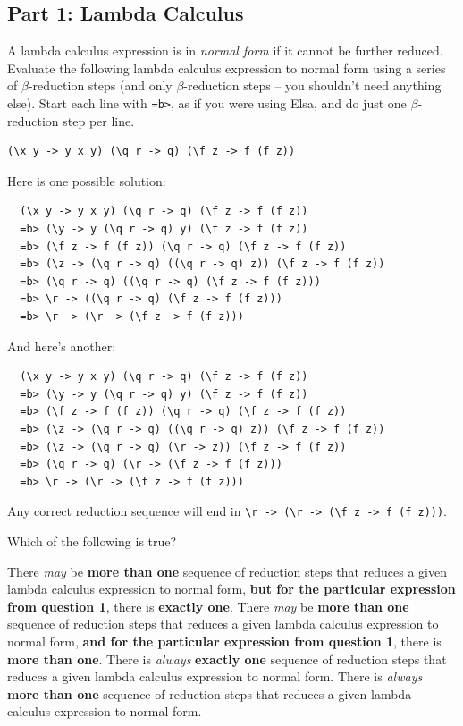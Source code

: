 \documentclass[addpoints]{exam}
\begin{document}
\begin{questions}

\subsection*{\textbf{Part 1: Lambda Calculus}}

\question[3] A lambda calculus expression is in \emph{normal form} if it cannot be further reduced.  Evaluate the following lambda calculus expression to normal form using a series of $\beta$-reduction steps (and only $\beta$-reduction steps -- you shouldn't need anything else).  Start each line with \texttt{=b>}, as if you were using Elsa, and do just one $\beta$-reduction step per line.

\begin{verbatim}
(\x y -> y x y) (\q r -> q) (\f z -> f (f z))
\end{verbatim}
\begin{solutionorbox}[4.75in]
Here is one possible solution:
\begin{verbatim}
  (\x y -> y x y) (\q r -> q) (\f z -> f (f z))
  =b> (\y -> y (\q r -> q) y) (\f z -> f (f z))
  =b> (\f z -> f (f z)) (\q r -> q) (\f z -> f (f z))
  =b> (\z -> (\q r -> q) ((\q r -> q) z)) (\f z -> f (f z))
  =b> (\q r -> q) ((\q r -> q) (\f z -> f (f z)))
  =b> \r -> ((\q r -> q) (\f z -> f (f z)))
  =b> \r -> (\r -> (\f z -> f (f z)))
\end{verbatim}
And here's another:
\begin{verbatim}
  (\x y -> y x y) (\q r -> q) (\f z -> f (f z))
  =b> (\y -> y (\q r -> q) y) (\f z -> f (f z))
  =b> (\f z -> f (f z)) (\q r -> q) (\f z -> f (f z))
  =b> (\z -> (\q r -> q) ((\q r -> q) z)) (\f z -> f (f z))
  =b> (\z -> (\q r -> q) (\r -> z)) (\f z -> f (f z))
  =b> (\q r -> q) (\r -> (\f z -> f (f z)))
  =b> \r -> (\r -> (\f z -> f (f z)))
\end{verbatim}
Any correct reduction sequence will end in \verb|\r -> (\r -> (\f z -> f (f z)))|.
\end{solutionorbox}

\question[3] Which of the following is true?

\begin{checkboxes}
  \choice There \emph{may} be \textbf{more than one} sequence of reduction steps that reduces a given lambda calculus expression to normal form, \textbf{but for the particular expression from question 1}, there is \textbf{exactly one}.
  \CorrectChoice There \emph{may} be \textbf{more than one} sequence of reduction steps that reduces a given lambda calculus expression to normal form, \textbf{and for the particular expression from question 1}, there is \textbf{more than one}.
  \choice There is \emph{always} \textbf{exactly one} sequence of reduction steps that reduces a given lambda calculus expression to normal form.
  \choice There is \emph{always} \textbf{more than one} sequence of reduction steps that reduces a given lambda calculus expression to normal form.
\end{checkboxes}


\end{questions}
\end{document}
